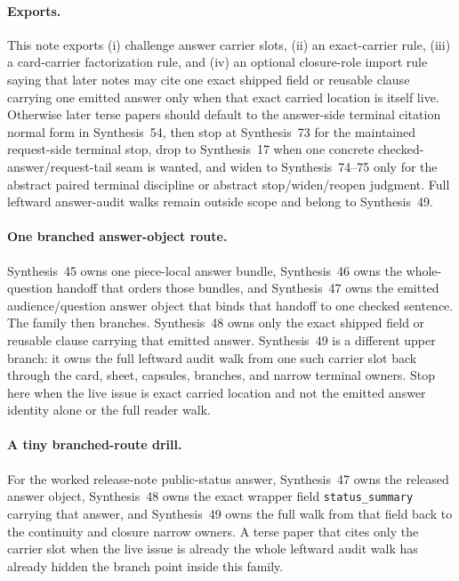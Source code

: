 \documentclass[11pt]{article}
\begin{document}
\paragraph{Exports.}
This note exports (i) challenge answer carrier slots, (ii) an exact-carrier rule, (iii) a card-carrier factorization rule, and (iv) an optional closure-role import rule saying that later notes may cite one exact shipped field or reusable clause carrying one emitted answer only when that exact carried location is itself live.
Otherwise later terse papers should default to the answer-side terminal citation normal form in Synthesis~54, then stop at Synthesis~73 for the maintained request-side terminal stop, drop to Synthesis~17 when one concrete checked-answer/request-tail seam is wanted, and widen to Synthesis~74--75 only for the abstract paired terminal discipline or abstract stop/widen/reopen judgment. Full leftward answer-audit walks remain outside scope and belong to Synthesis~49.\cite{series:challengeanswerreviewmenus,series:workedexample,series:pairedterminalcitationdiscipline,series:pairedterminalcutoverrules}

\paragraph{One branched answer-object route.}
Synthesis~45 owns one piece-local answer bundle, Synthesis~46 owns the whole-question handoff that orders those bundles, and Synthesis~47 owns the emitted audience/question answer object that binds that handoff to one checked sentence. The family then branches. Synthesis~48 owns only the exact shipped field or reusable clause carrying that emitted answer. Synthesis~49 is a different upper branch: it owns the full leftward audit walk from one such carrier slot back through the card, sheet, capsules, branches, and narrow terminal owners. Stop here when the live issue is exact carried location and not the emitted answer identity alone or the full reader walk.

\paragraph{A tiny branched-route drill.}
For the worked release-note public-status answer, Synthesis~47 owns the released answer object, Synthesis~48 owns the exact wrapper field \nolinkurl{status_summary} carrying that answer, and Synthesis~49 owns the full walk from that field back to the continuity and closure narrow owners. A terse paper that cites only the carrier slot when the live issue is already the whole leftward audit walk has already hidden the branch point inside this family.
\end{document}
